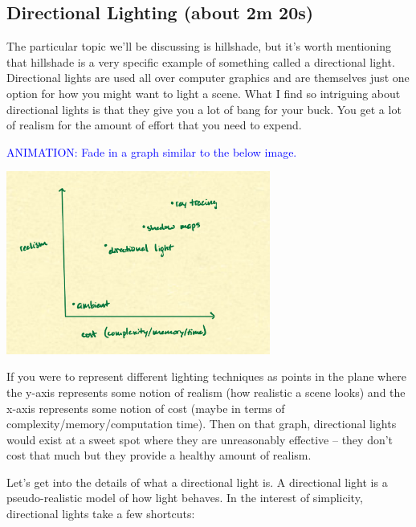 \documentclass{article}
\newcommand\animation[1]{\textcolor{blue}{ANIMATION: #1}}
\begin{document}
\subsection{Directional Lighting (about 2m 20s)}

The particular topic we'll be discussing is hillshade, but it's worth mentioning that hillshade is a very specific example of something called a directional light.
Directional lights are used all over computer graphics and are themselves just one option for how you might want to light a scene.
What I find so intriguing about directional lights is that they give you a lot of bang for your buck.
You get a lot of realism for the amount of effort that you need to expend.

\animation{Fade in a graph similar to the below image.}

\begin{center}
	\includegraphics[width=0.65\textwidth,frame]{assets/realism.jpg}
\end{center}

If you were to represent different lighting techniques as points in the plane where the y-axis represents some notion of realism (how realistic a scene looks) and the x-axis represents some notion of cost (maybe in terms of complexity/memory/computation time).
Then on that graph, directional lights would exist at a sweet spot where they are unreasonably effective -- they don't cost that much but they provide a healthy amount of realism.

Let's get into the details of what a directional light is.
A directional light is a pseudo-realistic model of how light behaves.
In the interest of simplicity, directional lights take a few shortcuts:
\end{document}
